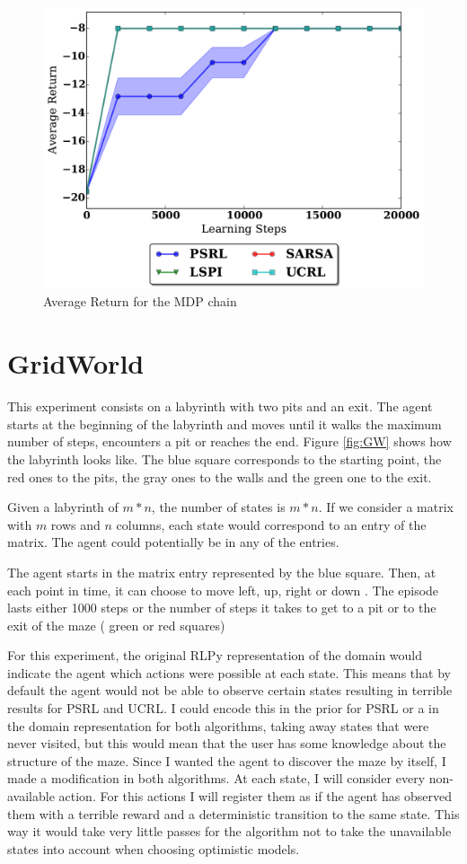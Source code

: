 \documentclass[12pt]{article}
\begin{document}
\begin{figure}[h]
\centering
\includegraphics[scale=.4]{MDP.pdf}
\caption{Average Return for the MDP chain}
\label{fig:res_mdp}
\end{figure}


\FloatBarrier
\section{GridWorld}
\label{sec:grid}
This experiment consists on a labyrinth with two pits and an exit. The agent starts at the beginning of the labyrinth and moves until it walks the maximum number of steps, encounters a pit or reaches the end. Figure \ref{fig:GW} shows how the labyrinth looks like. The blue square corresponds to the starting point, the red ones to the pits, the gray ones to the walls and the green one to the exit.

Given a labyrinth of $m*n$, the number of states is $m*n$. If we consider a matrix with $m$ rows and $n$ columns, each state would correspond to an entry of the matrix. The agent could potentially be in any of the entries.

The agent starts in the matrix entry represented by the blue square. Then, at each point in time, it can choose to move left, up, right or down . The episode lasts either 1000 steps or the number of steps it takes to get to a pit or to the exit of the maze ( green or red squares)

For this experiment, the original RLPy representation of the domain would indicate the agent which actions were possible at each state. This means that by default the agent would not be able to observe certain states resulting in terrible results for PSRL and UCRL. I could encode this in the prior for PSRL or a in the domain representation for both algorithms, taking away states that were never visited, but this would mean that the user has some knowledge about the structure of the maze. Since I wanted the agent to discover the maze by itself, I made a modification in both algorithms. At each state, I will consider every non-available action. For this actions I will register them as if the agent has observed them with a terrible reward and a deterministic transition to the same state. This way it would take very little passes for the algorithm not to take the unavailable states into account when choosing optimistic models.
\end{document}
